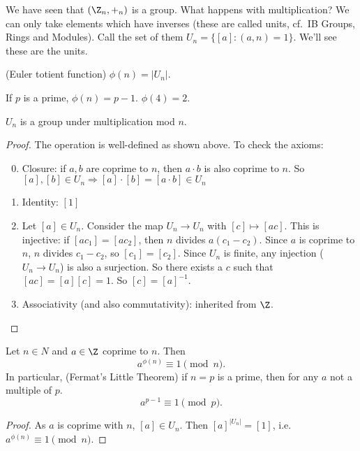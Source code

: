 \documentclass[a4paper]{article}
\begin{document}
We have seen that $(\Z_n, +_n)$ is a group. What happens with multiplication? We can only take elements which have inverses (these are called units, cf.\ IB Groups, Rings and Modules). Call the set of them $U_n = \{[a]: (a, n) = 1\}$. We'll see these are the units.
\begin{defi}
  (Euler totient function) $\phi (n) = |U_n|$.
\end{defi}

\begin{eg}
  If $p$ is a prime, $\phi(n) = p - 1$. $\phi(4) = 2$.
\end{eg}

\begin{prop}
  $U_n$ is a group under multiplication mod $n$.
\end{prop}

\begin{proof}
  The operation is well-defined as shown above. To check the axioms:
  \begin{enumerate}[label=\arabic{*}.]
      \setcounter{enumi}{-1}
    \item Closure: if $a, b$ are coprime to $n$, then $a\cdot b$ is also coprime to $n$. So $[a], [b]\in U_n \Rightarrow [a]\cdot [b] = [a\cdot b]\in U_n$
    \item Identity: $[1]$
    \item Let $[a]\in U_n$. Consider the map $U_n \to U_n$ with $[c]\mapsto [ac]$. This is injective: if $[ac_1] = [ac_2]$, then $n $ divides $a(c_1 - c_2)$. Since $a$ is coprime to $n$, $n$ divides $c_1 - c_2$, so $[c_1] = [c_2]$. Since $U_n$ is finite, any injection ($U_n \to U_n$) is also a surjection. So there exists a $c$ such that $[ac] = [a][c] = 1$. So $[c] = [a]^{-1}$.
    \item Associativity (and also commutativity): inherited from $\Z$.\qedhere
  \end{enumerate}
\end{proof}

\begin{thm} Let $n\in N$ and $a\in \Z$ coprime to $n$. Then
  \[
    a^{\phi(n)} \equiv 1\pmod n.
  \]
  In particular, (Fermat's Little Theorem) if $n = p$ is a prime, then for any $a$ not a multiple of $p$.
  \[
    a^{p - 1}\equiv 1\pmod p.
  \]
\end{thm}

\begin{proof}
  As $a$ is coprime with $n$, $[a]\in U_n$. Then $[a]^{|U_n|} = [1]$, i.e.\ $a^{\phi(n)} \equiv 1\pmod n$.
\end{proof}
\end{document}
